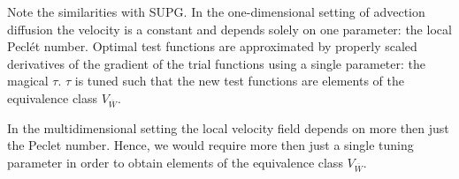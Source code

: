 \begin{remark} Note the similarities with SUPG. In the one-dimensional setting of advection diffusion the velocity is a constant and depends solely on one parameter: the local Pecl\'et number. Optimal test functions are approximated by properly scaled derivatives of the gradient of the trial functions using a single parameter: the magical $\tau$. $\tau$ is tuned such that the new test functions are elements of the equivalence class $V_{\overline{W}}$.
\end{remark}

\begin{remark} In the multidimensional setting the local velocity field depends on more then just the Peclet number. Hence, we would require more then just a single tuning parameter in order to obtain elements of the equivalence class $V_{\overline{W}}$.
\end{remark}






